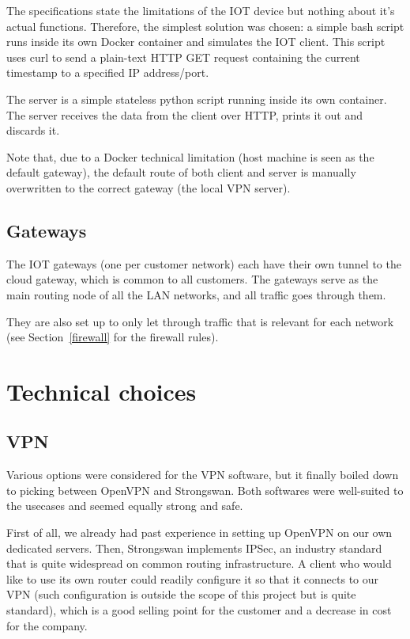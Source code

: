 \documentclass[paper=a4, fontsize=11pt]{scrartcl}
\begin{document}
The specifications state the limitations of the IOT device but nothing about
it's actual functions.
Therefore, the simplest solution was chosen: a simple bash script runs inside
its own Docker container and simulates the IOT client.
This script uses curl to send a plain-text HTTP GET request containing the
current timestamp to a specified IP address/port.

The server is a simple stateless python script running inside its
own container.
The server receives the data from the client over HTTP, prints it out and
discards it.

Note that, due to a Docker technical limitation (host machine is seen as the
default gateway), the default route of both client and server is manually
overwritten to the correct gateway (the local VPN server).

\subsection{Gateways}

The IOT gateways (one per customer network) each have their own tunnel to the
cloud gateway, which is common to all customers.
The gateways serve as the main routing node of all the LAN networks, and all
traffic goes through them.

They are also set up to only let through traffic that is relevant for each
network (see Section~\ref{firewall} for the firewall rules).

\section{Technical choices}

\subsection{VPN}

Various options were considered for the VPN software, but it finally boiled down
to picking between OpenVPN and Strongswan.
Both softwares were well-suited to the usecases and seemed equally strong and
safe.

First of all, we already had past experience in setting up OpenVPN on our own
dedicated servers.
Then, Strongswan implements IPSec, an industry standard that is quite widespread
on common routing infrastructure.
A client who would like to use its own router could readily configure
it so that it connects to our VPN (such configuration is outside the
scope of this project but is quite standard), which is a good selling point for
the customer and a decrease in cost for the company.
\end{document}
